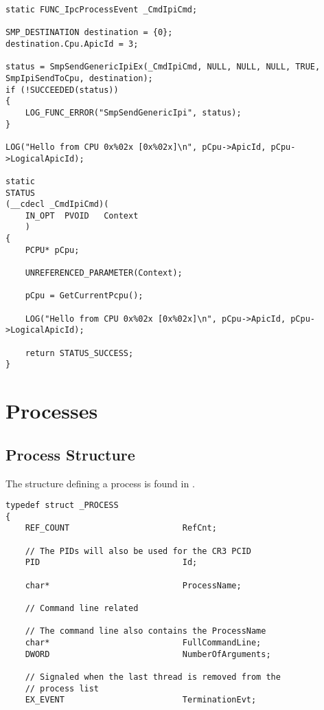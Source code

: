 \begin{appendices}
\begin{itemize}
\begin{lstlisting}[caption={Specific target CPU},label={lst:IpiSendToCPU}]
static FUNC_IpcProcessEvent _CmdIpiCmd;

SMP_DESTINATION destination = {0};
destination.Cpu.ApicId = 3;

status = SmpSendGenericIpiEx(_CmdIpiCmd, NULL, NULL, NULL, TRUE, SmpIpiSendToCpu, destination);
if (!SUCCEEDED(status))
{
    LOG_FUNC_ERROR("SmpSendGenericIpi", status);
}

LOG("Hello from CPU 0x%02x [0x%02x]\n", pCpu->ApicId, pCpu->LogicalApicId);

static
STATUS
(__cdecl _CmdIpiCmd)(
    IN_OPT  PVOID   Context
    )
{
    PCPU* pCpu;

    UNREFERENCED_PARAMETER(Context);

    pCpu = GetCurrentPcpu();

    LOG("Hello from CPU 0x%02x [0x%02x]\n", pCpu->ApicId, pCpu->LogicalApicId);

    return STATUS_SUCCESS;
}
	\end{lstlisting}

\end{itemize}

\section{Processes}
\label{sect:Processes}

\subsection{Process Structure}

The structure defining a process is found in .

\begin{lstlisting}[caption={Process Structure},label={lst:ProcessStruct}]
typedef struct _PROCESS
{
    REF_COUNT                       RefCnt;

    // The PIDs will also be used for the CR3 PCID
    PID                             Id;

    char*                           ProcessName;

    // Command line related

    // The command line also contains the ProcessName
    char*                           FullCommandLine;
    DWORD                           NumberOfArguments;

    // Signaled when the last thread is removed from the
    // process list
    EX_EVENT                        TerminationEvt;


\end{lstlisting}
\end{appendices}
